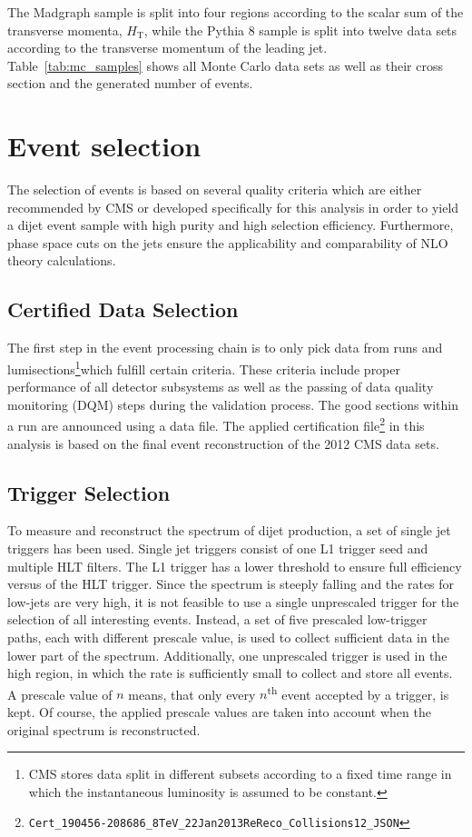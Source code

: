 The Madgraph sample is split into four regions according to the scalar sum of
the transverse momenta, $H_{\mathrm{T}}$, while the Pythia 8 sample is split
into twelve data sets according to the transverse momentum of the leading jet.
Table~\ref{tab:mc_samples} shows all Monte Carlo data sets as well as their cross
section and the generated number of events.

\section{Event selection}
\label{sec:event_selection}

The selection of events is based on several quality criteria which are either
recommended by CMS or developed specifically for this analysis in order to yield
a dijet event sample with high purity and high selection efficiency.
Furthermore, phase space cuts on the jets ensure the applicability and
comparability of NLO theory calculations.

\subsection{Certified Data Selection}

The first step in the event processing chain is to only pick data from runs and
lumisections\footnote{CMS stores data split in different subsets according to
    a fixed time range in which the instantaneous luminosity is assumed to be
constant.}which fulfill certain criteria. These criteria include
proper performance of all detector subsystems as well as the passing of data
quality monitoring (DQM) steps during the validation process. The good
sections within a run are announced using a data file. The applied certification
file\footnote{\texttt{Cert\_190456-208686\_8TeV\_22Jan2013ReReco\_Collisions12\_JSON}}
in this analysis is based on the final event reconstruction of the 2012 CMS data
sets.

\subsection{Trigger Selection}

To measure and reconstruct the \ptavg spectrum of dijet production, a set of
single jet triggers has been used. Single jet triggers consist of one L1 trigger
seed and multiple HLT filters. The L1 trigger has a lower threshold to ensure
full efficiency versus \pt of the HLT trigger. Since the \pt spectrum is steeply
falling and the rates for low-\pt jets are very high, it is not feasible to use
a single unprescaled trigger for the selection of all interesting events.
Instead, a set of five prescaled low-\pt trigger paths, each with different
prescale value, is used to collect sufficient data in the lower part of the \pt
spectrum.  Additionally, one unprescaled trigger is used in the high \pt region, in
which the rate is sufficiently small to collect and store all
events. A prescale value of $n$ means, that only every $n$\textsuperscript{th} event accepted by
a trigger, is kept. Of course, the applied prescale values are taken into
account when the original spectrum is reconstructed. 

